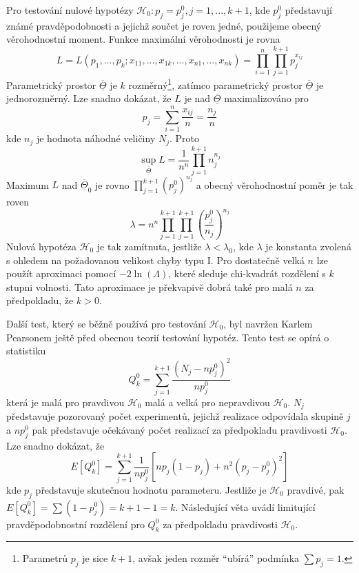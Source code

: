 Pro testování nulové hypotézy $\mathscr{H}_0: p_j = p_j^0, j = 1, ..., k + 1$, kde $p_j^0$ představují známé pravděpodobnosti a jejichž součet je roven jedné, použijeme obecný věrohodnostní moment. Funkce maximální věrohodnosti je rovna
\begin{equation*}
L = L(p_1, ..., p_k; x_{11}, ..., x_{1k}, ..., x_{n1}, ..., x_{nk}) = \prod_{i = 1}^n \prod_{j = 1}^{k + 1} p_j^{x_{ij}}
\end{equation*}
Parametrický prostor $\overline{\underline{\Theta}}$ je $k$ rozměrný\footnote{Parametrů $p_j$ je sice $k + 1$, avšak jeden rozměr ``ubírá'' podmínka $\sum p_j = 1$.}, zatímco parametrický prostor $\overline{\underline{\Theta}}$ je jednorozměrný. Lze snadno dokázat, že $L$ je nad $\overline{\underline{\Theta}}$ maximalizováno pro
\begin{equation*}
p_j = \sum_{i = 1}^n \frac{x_{ij}}{n} = \frac{n_j}{n}
\end{equation*}
kde $n_j$ je hodnota náhodné veličiny $N_j$. Proto
\begin{equation*}
\sup_{\overline{\underline{\Theta}}} L = \frac{1}{n^n}\prod_{j = 1}^{k + 1}n_j^{n_j}
\end{equation*}
Maximum $L$ nad $\overline{\underline{\Theta}}_0$ je rovno $\prod_{j = 1}^{k + 1} (p_j^0)^{n_j}$ a obecný věrohodnostní poměr je tak roven
\begin{equation*}
\lambda = n^n \prod_{j = 1}^{k + 1}\prod_{j = 1}^{k + 1}\left(\frac{p_j^0}{n_j}\right)^{n_j}
\end{equation*}
Nulová hypotéza $\mathscr{H}_0$ je tak zamítnuta, jestliže $\lambda < \lambda_0$, kde $\lambda$ je konstanta zvolená s ohledem na požadovanou velikost chyby typu I. Pro dostatečně velká $n$ lze použít aproximaci pomocí $-2 \ln(\Lambda)$, které sleduje chi-kvadrát rozdělení s $k$ stupni volnosti. Tato aproximace je překvapivě dobrá také pro malá $n$ za předpokladu, že $k > 0$.

Další test, který se běžně používá pro testování $\mathscr{H}_0$, byl navržen Karlem Pearsonem ještě před obecnou teorií testování hypotéz. Tento test se opírá o statistiku
\begin{equation*}
Q_k^0 = \sum_{j = 1}^{k + 1}\frac{(N_j - np_j^0)^2}{np_j^0}
\end{equation*}
která je malá pro pravdivou $\mathscr{H}_0$ malá a velká pro nepravdivou $\mathscr{H}_0$. $N_j$ představuje pozorovaný počet experimentů, jejichž realizace odpovídala skupině $j$ a $np_j^0$ pak představuje očekávaný počet realizací za předpokladu pravdivosti $\mathscr{H}_0$. Lze snadno dokázat, že
\begin{equation*}
E[Q_k^0] = \sum_{j = 1}^{k + 1}\frac{1}{np_j^0}[np_j(1 - p_j) + n^2(p_j - p_j^0)^2]
\end{equation*}
kde $p_j$ představuje skutečnou hodnotu parameteru. Jestliže je $\mathscr{H}_0$ pravdivé, pak $E[Q_k^0] = \sum (1 - p_j^0) = k + 1 - 1 = k$. Následující věta uvádí limitující pravděpodobnostní rozdělení pro $Q_k^0$ za předpokladu pravdivosti $\mathscr{H}_0$.


